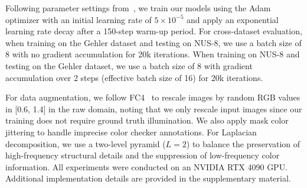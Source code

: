Following parameter settings from~\cite{garcia2024fine}, we train our models using the Adam optimizer with an initial learning rate of $5 \times 10^{-5}$ and apply an exponential learning rate decay after a 150-step warm-up period. For cross-dataset evaluation, when training on the Gehler dataset and testing on NUS-8, we use a batch size of 8 with no gradient accumulation for 20k iterations. When training on NUS-8 and testing on the Gehler dataset, we use a batch size of 8 with gradient accumulation over 2 steps (effective batch size of 16) for 20k iterations. 

For data augmentation, we follow FC4~\cite{hu2017fc4} to rescale images by random RGB values in [0.6, 1.4] in the raw domain, noting that we only rescale input images since our training does not require ground truth illumination. We also apply mask color jittering to handle imprecise color checker annotations. For Laplacian decomposition, we use a two-level pyramid ($L=2$) to balance the preservation of high-frequency structural details and the suppression of low-frequency color information. All experiments were conducted on an NVIDIA RTX 4090 GPU. Additional implementation details are provided in the supplementary material.






